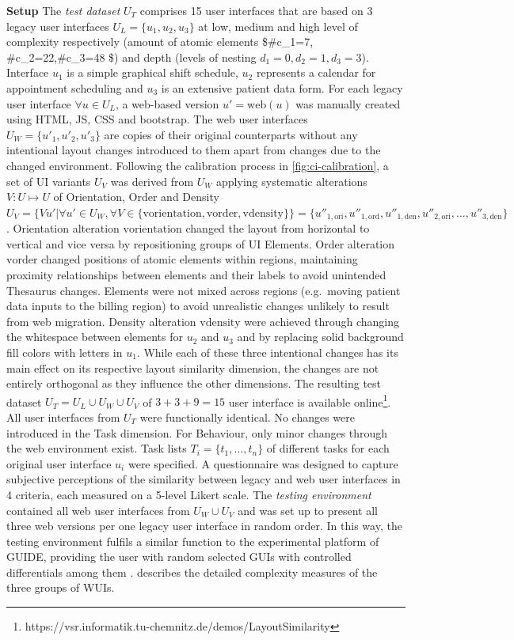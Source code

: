 \textbf{Setup} The \emph{test dataset} \(U_T\) comprises 15 user interfaces that are based on 3 legacy user interfaces \(U_L = \{u_1, u_2, u_3\}\) at low, medium and high level of complexity respectively (amount of atomic elements \$\#c\_1=7, \#c\_2=22,\#c\_3=48 \$) and depth (levels of nesting \(d_1=0, d_2=1, d_3 = 3\)).
Interface \(u_1\) is a simple graphical shift schedule, \(u_2\) represents a calendar for appointment scheduling and \(u_3\) is an extensive patient data form.
For each legacy user interface \(\forall u \in U_L\), a web-based version \(u' = \text{web}(u)\) was manually created using HTML, JS, CSS and bootstrap.
The web user interfaces \(U_W=\{u'_1, u'_2, u'_3\}\) are copies of their original counterparts without any intentional layout changes introduced to them apart from changes due to the changed environment.
Following the calibration process in \cref{fig:ci-calibration}, a set of UI variants \(U_V\) was derived from \(U_W\) applying systematic alterations \(V: U \mapsto U\) of Orientation, Order and Density \(U_V=\{Vu' | \forall u' \in U_W, \forall V \in \{\text{vorientation},\text{vorder},\text{vdensity}\}\}=\{u''_{1,\text{ori}},u''_{1,\text{ord}},u''_{1,\text{den}}, u''_{2,\text{ori}}, \ldots, u''_{3,\text{den}}\}\).
Orientation alteration \(\text{vorientation}\) changed the layout from horizontal to vertical and vice versa by repositioning groups of UI Elements.
Order alteration \(\text{vorder}\) changed positions of atomic elements within regions, maintaining proximity relationships between elements and their labels to avoid unintended Thesaurus changes.
Elements were not mixed across regions (e.g.~moving patient data inputs to the billing region) to avoid unrealistic changes unlikely to result from web migration.
Density alteration \(\text{vdensity}\) were achieved through changing the whitespace between elements for \(u_2\) and \(u_3\) and by replacing solid background fill colors with letters in \(u_1\).
While each of these three intentional changes has its main effect on its respective layout similarity dimension, the changes are not entirely orthogonal as they influence the other dimensions.
The resulting test dataset \(U_T = U_L \cup U_W \cup U_V\) of \(3+3+9=15\) user interface is available online\footnote{https://vsr.informatik.tu-chemnitz.de/demos/LayoutSimilarity}.
All user interfaces from \(U_T\) were functionally identical.
No changes were introduced in the Task dimension.
For Behaviour, only minor changes through the web environment exist.
Task lists \(T_i = \{t_1,\ldots,t_n\}\) of different tasks for each original user interface \(u_i\) were specified.
A questionnaire was designed to capture subjective perceptions of the similarity between legacy and web user interfaces in 4 criteria, each measured on a 5-level Likert scale.
The \emph{testing environment} contained all web user interfaces from \(U_W \cup U_V\) and was set up to present all three web versions per one legacy user interface in random order.
In this way, the testing environment fulfils a similar function to the experimental platform of GUIDE, providing the user with random selected GUIs with controlled differentials among them \autocite{Grechanik2018}.
 describes the detailed complexity measures of the three groups of WUIs.

